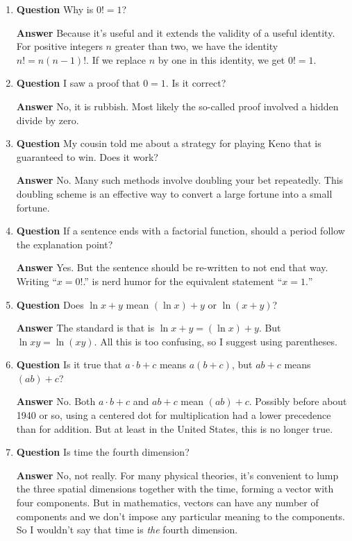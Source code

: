 \documentclass[12pt]{article}
\newcounter{ex}\setcounter{ex}{0}
\newcounter{cd}\setcounter{cd}{24}
\begin{document}
\begin{enumerate}
\item  \textbf{Question} Why is \(0! = 1\)?

 \textbf{Answer} Because it's useful and it extends the validity of a useful identity. For positive integers \(n\) greater than two, we have the identity \(n! = n (n-1)!\). If we replace \(n\) by one in this identity, we get \(0! = 1\). 

\item  \textbf{Question} I saw a proof that \(0=1\).  Is it correct?

  \textbf{Answer}  No, it is rubbish. Most likely the so-called proof involved a hidden divide by zero.


\item  \textbf{Question} My cousin told me about a strategy for playing Keno that is guaranteed to win. Does it work?

 \textbf{Answer} No. Many such methods involve doubling your bet repeatedly. This doubling scheme is 
an effective way to convert  a large fortune into a small fortune.

\item  \textbf{Question}  If a sentence ends with a factorial function, should a period follow the explanation point?

  \textbf{Answer}  Yes. But the sentence should be re-written to not end that way.  Writing ``\(x = 0!\).''  is nerd humor for the equivalent statement ``\(x = 1.\)''

\item  \textbf{Question} Does \(\ln x + y\) mean \((\ln x) + y \) or   \(\ln  (x + y)\)?

 \textbf{Answer} The standard is that is \(\ln x + y = (\ln x) + y \). But \( \ln x y = \ln(xy)\).  All this is too confusing, so I suggest using parentheses. 

\item  \textbf{Question}  Is it true that \(a \cdot b  + c\) means \(a (b+c)\), but \(a  b  + c\) means \((ab) + c\)?

 \textbf{Answer} No.  Both  \(a \cdot b  + c\) and \(a b + c\) mean  \((ab) + c\).  Possibly before about 1940 or so, using a centered dot for multiplication had a lower precedence than for addition. But at least in the United States, this is no longer true.



\item  \textbf{Question}  Is time the fourth dimension?

\textbf{Answer} No, not really.  For many physical theories, it's convenient to lump the three spatial dimensions together with the time, forming a vector with four components. But in mathematics, 
vectors can have any number of components and we don't impose any particular meaning to the components. So I wouldn't say that time is \emph{the} fourth dimension.


\end{enumerate}
\end{document}
